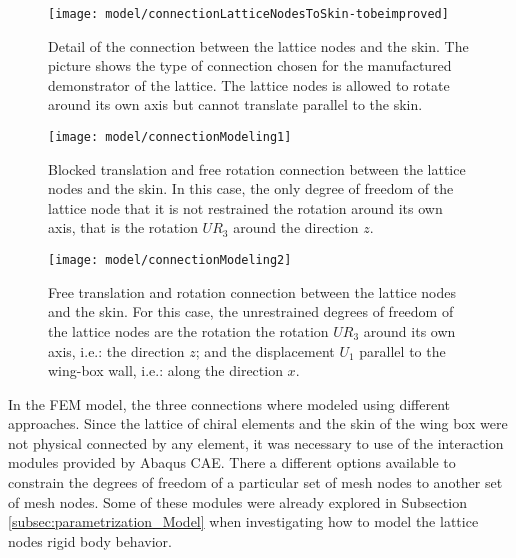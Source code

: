 \begin{figure}[!htpb]
  \centering
  \texttt{[image: model/connectionLatticeNodesToSkin-tobeimproved]}
  \caption[Detail of the connection between the lattice nodes and the skin]{Detail of the connection between the lattice nodes and the skin. The picture shows the type of connection chosen for the manufactured demonstrator of the lattice. The lattice nodes is allowed to rotate around its own axis but cannot translate parallel to the skin. \cite{Vincenz2017}}\label{fig:connectionLatticeNodesToSkin-tobeimproved}
\end{figure}

\begin{figure}[!htpb]
  \centering
  \texttt{[image: model/connectionModeling1]}
  \caption[Blocked translation and free rotation connection between the lattice nodes and the skin]{Blocked translation and free rotation connection between the lattice nodes and the skin. In this case, the only degree of freedom of the lattice node that it is not restrained the rotation around its own axis, that is the rotation $UR_3$ around the direction $z$.}\label{fig:connectionModeling1}
\end{figure}

\begin{figure}[!htpb]
  \centering
  \texttt{[image: model/connectionModeling2]}
  \caption[Free translation and rotation connection between the lattice nodes and the skin]{Free translation and rotation connection between the lattice nodes and the skin. For this case, the unrestrained degrees of freedom of the lattice nodes are the rotation the rotation $UR_3$ around its own axis, i.e.: the direction $z$; and the displacement $U_1$ parallel to the wing-box wall, i.e.: along the direction $x$.}\label{fig:connectionModeling2}
\end{figure}

In the FEM model, the three connections where modeled using different approaches. Since the lattice of chiral elements and the skin of the wing box were not physical connected by any element, it was necessary to use of the interaction modules provided by Abaqus CAE. There a different options available to constrain the degrees of freedom of a particular set of mesh nodes to another set of mesh nodes. Some of these modules were already explored in Subsection \ref{subsec:parametrization_Model} when investigating how to model the lattice nodes rigid body behavior.

